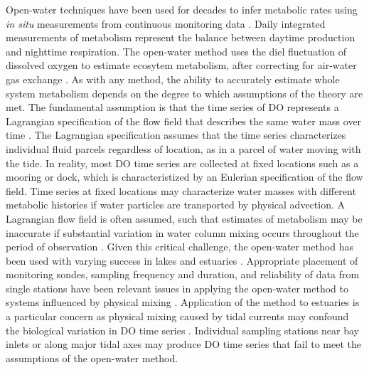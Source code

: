 \documentclass[letterpaper,12pt,oneside]{article}\usepackage[]{graphicx}\usepackage[]{color}
\begin{document}
Open-water techniques have been used for decades to infer metabolic rates using \textit{in situ} measurements from continuous monitoring data \citep{Odum56}. Daily integrated measurements of metabolism represent the balance between daytime production and nighttime respiration.  The open-water method uses the diel fluctuation of dissolved oxygen to estimate ecosytem metabolism, after correcting for air-water gas exchange \citep{Kemp12}.  As with any method, the ability to accurately estimate whole system metabolism depends on the degree to which assumptions of the theory are met.  The fundamental assumption is that the time series of \ac{DO} represents a Lagrangian specification of the flow field that describes the same water mass over time \citep{Needoba12}.  The Lagrangian specification assumes that the time series characterizes individual fluid parcels regardless of location, as in a parcel of water moving with the tide.  In reality, most \ac{DO} time series are collected at fixed locations such as a mooring or dock, which is characteristized by an Eulerian specification of the flow field.  Time series at fixed locations may characterize water masses with different metabolic histories if water particles are transported by physical advection.  
A Lagrangian flow field is often assumed, such that estimates of metabolism may be inaccurate if substantial variation in water column mixing occurs throughout the period of observation \citep{Kemp80,Russell07}.  Given this critical challenge, the open-water method has been used with varying success in lakes \citep{Staehr10,Coloso11,Batt12} and estuaries \citep{Caffrey04,Russell07,Caffrey13}.  Appropriate placement of monitoring sondes, sampling frequency and duration, and reliability of data from single stations have been relevant issues in applying the open-water method to systems influenced by physical mixing \citep{Russell07,Staehr10}.  Application of the method to estuaries is a particular concern as physical mixing caused by tidal currents may confound the biological variation in \ac{DO} time series \citep{Kemp80,Caffrey03,Nidzieko14}.  Individual sampling stations near bay inlets or along major tidal axes may produce \ac{DO} time series that fail to meet the assumptions of the open-water method.   
\end{document}
